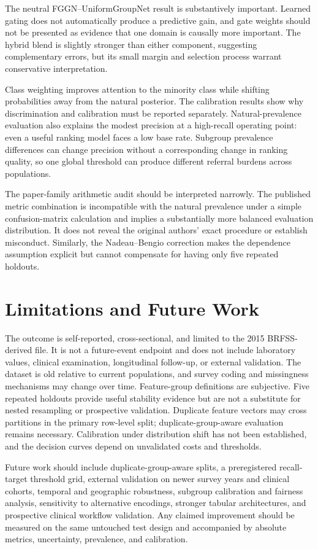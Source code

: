 \documentclass[conference,10pt]{IEEEtran}
\begin{document}
The neutral FGGN--UniformGroupNet result is substantively important. Learned gating does not automatically produce a predictive gain, and gate weights should not be presented as evidence that one domain is causally more important. The hybrid blend is slightly stronger than either component, suggesting complementary errors, but its small margin and selection process warrant conservative interpretation.

Class weighting improves attention to the minority class while shifting probabilities away from the natural posterior. The calibration results show why discrimination and calibration must be reported separately. Natural-prevalence evaluation also explains the modest precision at a high-recall operating point: even a useful ranking model faces a low base rate. Subgroup prevalence differences can change precision without a corresponding change in ranking quality, so one global threshold can produce different referral burdens across populations.

The paper-family arithmetic audit should be interpreted narrowly. The published metric combination is incompatible with the natural prevalence under a simple confusion-matrix calculation and implies a substantially more balanced evaluation distribution. It does not reveal the original authors' exact procedure or establish misconduct. Similarly, the Nadeau--Bengio correction makes the dependence assumption explicit but cannot compensate for having only five repeated holdouts.

\section{Limitations and Future Work}
The outcome is self-reported, cross-sectional, and limited to the 2015 BRFSS-derived file. It is not a future-event endpoint and does not include laboratory values, clinical examination, longitudinal follow-up, or external validation. The dataset is old relative to current populations, and survey coding and missingness mechanisms may change over time. Feature-group definitions are subjective. Five repeated holdouts provide useful stability evidence but are not a substitute for nested resampling or prospective validation. Duplicate feature vectors may cross partitions in the primary row-level split; duplicate-group-aware evaluation remains necessary. Calibration under distribution shift has not been established, and the decision curves depend on unvalidated costs and thresholds.

Future work should include duplicate-group-aware splits, a preregistered recall-target threshold grid, external validation on newer survey years and clinical cohorts, temporal and geographic robustness, subgroup calibration and fairness analysis, sensitivity to alternative encodings, stronger tabular architectures, and prospective clinical workflow validation. Any claimed improvement should be measured on the same untouched test design and accompanied by absolute metrics, uncertainty, prevalence, and calibration.
\end{document}
